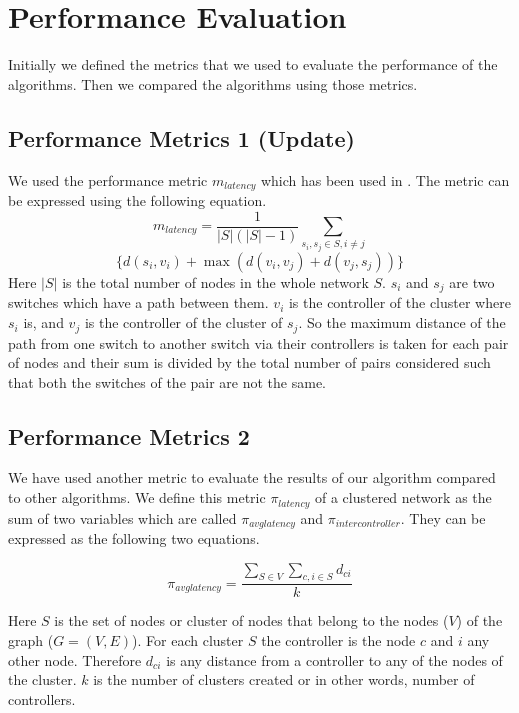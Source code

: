 \documentclass[10pt]{extarticle}
\begin{document}
	
	\section{Performance Evaluation}
	
	Initially we defined the metrics that we used to evaluate the performance of the algorithms. Then we compared the algorithms using those metrics.
	
	\subsection{Performance Metrics 1 (Update)} \label{perfm}
	
	We used the performance metric $m_{latency}$ which has been used in \cite{dbcp}. The metric can be expressed using the following equation.
	\[m_{latency} = \frac{1}{|S|(|S|-1)}\sum_{s_i,s_j\in S, i\neq j}\]
	\begin{equation}
	\{d(s_i,v_i)+\max(d(v_i,v_j)+d(v_j,s_j))\}
	\end{equation}
	Here $|S|$ is the total number of nodes in the whole network $S$. $s_i$ and $s_j$ are two switches which have a path between them. $v_i$ is the controller of the cluster where $s_i$ is, and $v_j$ is the controller of the cluster of $s_j$. So the maximum distance of the path from one switch to another switch via their controllers is taken for each pair of nodes and their sum is divided by the total number of pairs considered such that both the switches of the pair are not the same.
	
	\subsection{Performance Metrics 2} \label{myperfm}
	We have used another metric to evaluate the results of our algorithm compared to other algorithms. We define this metric $\pi_{latency}$ of a clustered network as the sum of two variables which are called $\pi_{avglatency}$ and $\pi_{intercontroller}$. They can be expressed as the following two equations.
	
	\begin{equation}
	\pi_{avglatency}=\frac{\sum_{S\in V}\sum_{c,i\in S}d_{ci}}{k}
	\end{equation}
	
	Here $S$ is the set of nodes or cluster of nodes that belong to the nodes ($V$) of the graph ($G=(V,E)$). For each cluster $S$ the controller is the node $c$ and $i$ any other node. Therefore $d_{ci}$ is any distance from a controller to any of the nodes of the cluster. $k$ is the number of clusters created or in other words, number of controllers.
	
\end{document}
